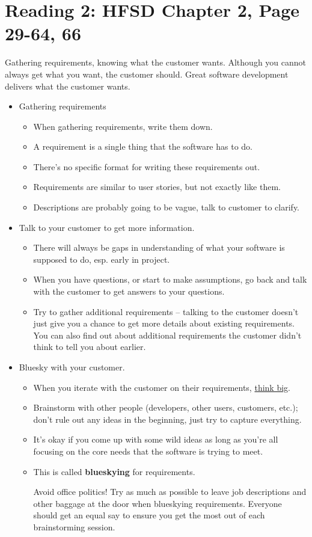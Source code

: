 \documentclass[letterpaper]{article}
\begin{document}
\section{Reading 2: HFSD Chapter 2, Page 29-64, 66}
Gathering requirements, knowing what the customer wants. Although you cannot always get what you want, the customer should. Great software development delivers what the customer wants.
\begin{itemize}
    \item Gathering requirements 
    \begin{itemize}
        \item When gathering requirements, write them down. 
        \item A requirement is a single thing that the software has to do. 
        \item There's no specific format for writing these requirements out.
        \item Requirements are similar to user stories, but not exactly like them. 
        \item Descriptions are probably going to be vague, talk to customer to clarify. 
    \end{itemize}

    \item Talk to your customer to get more information. 
    \begin{itemize}
        \item There will always be gaps in understanding of what your software is supposed to do, esp. early in project. 
        \item When you have questions, or start to make assumptions, go back and talk with the customer to get answers to your questions. 
        \item Try to gather additional requirements -- talking to the customer doesn't just give you a chance to get more details about existing requirements. You can also find out about additional requirements the customer didn't think to tell you about earlier. 
    \end{itemize}

    \item Bluesky with your customer. 
    \begin{itemize}
        \item When you iterate with the customer on their requirements, \underline{think big}. 
        \item Brainstorm with other people (developers, other users, customers, etc.); don't rule out any ideas in the beginning, just try to capture everything. 
        \item It's okay if you come up with some wild ideas as long as you're all focusing on the core needs that the software is trying to meet. 
        \item This is called \textbf{blueskying} for requirements. 
        \begin{mdframed}
            Avoid office politics! Try as much as possible to leave job descriptions and other baggage at the door when blueskying requirements. Everyone should get an equal say to ensure you get the most out of each brainstorming session. 
        \end{mdframed}


\end{itemize}
\end{itemize}
\end{document}
